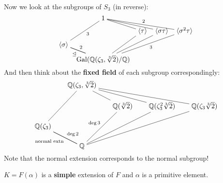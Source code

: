 \documentclass[12pt]{article}
\begin{document}
Now we look at the subgroups of $S_3$ (in reverse):
\[\begin{tikzcd}[ampersand replacement=\&,cramped,sep=tiny]
	\& 1 \\
	\&\& {\langle \tau\rangle} \& {\langle \sigma\tau\rangle} \& {\langle \sigma^2\tau\rangle} \\
	\langle\sigma\rangle \\
	\& {\mathrm{Gal}(\mathbb Q(\zeta_3,\sqrt[3]2)/\mathbb Q)}
	\arrow["3", no head, from=1-2, to=3-1]
	\arrow[no head, from=1-2, to=2-3]
	\arrow[no head, from=1-2, to=2-4]
	\arrow["2", no head, from=1-2, to=2-5]
	\arrow["2", no head, from=3-1, to=4-2]
    \arrow["{\nsub}"', no head, from=3-1, to=4-2]
	\arrow[no head, from=2-3, to=4-2]
	\arrow[no head, from=2-4, to=4-2]
	\arrow["3", no head, from=2-5, to=4-2]
\end{tikzcd}\]
And then think about the \textbf{fixed field} of each subgroup correspondingly:
\[\begin{tikzcd}[ampersand replacement=\&,cramped,sep=scriptsize]
	\& {\mathbb Q(\zeta_3,\sqrt[3]2)} \\
	\&\& {\mathbb Q(\sqrt[3]2)} \& {\mathbb Q(\zeta_3^2\sqrt[3]2)} \& {\mathbb Q(\zeta_3\sqrt[3]2)} \\
	{\mathbb Q(\zeta_3)} \\
	\& {\mathbb Q}
	\arrow[no head, from=1-2, to=3-1]
	\arrow[no head, from=1-2, to=2-3]
	\arrow[no head, from=1-2, to=2-4]
	\arrow[no head, from=1-2, to=2-5]
	\arrow["{\deg 2}", no head, from=3-1, to=4-2]
    \arrow["{\text{normal extn}}"', no head, from=3-1, to=4-2]
	\arrow["{\deg 3}"', no head, from=2-3, to=4-2]
	\arrow[no head, from=2-4, to=4-2]
	\arrow[no head, from=2-5, to=4-2]
\end{tikzcd}\]
Note that the normal extension corresponds to the normal subgroup!

\spl


 $K=F(\alpha)$ is a \textbf{simple} extension of $F$ and $\alpha$ is a primitive element.
\end{document}
